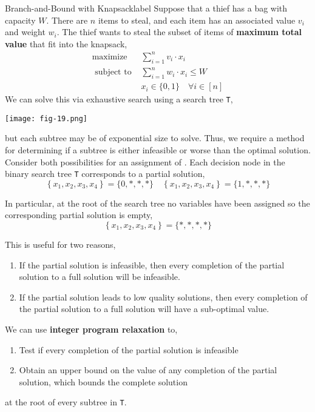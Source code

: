 \begin{ex}{Branch-and-Bound with Knapsack}{label}
	Suppose that a thief has a bag with capacity $W$. There are $n$ items to steal, and each item has an associated value $v_i$ and weight $w_i$. The thief wants to steal the subset of items of \textbf{maximum total value} that fit into the knapsack,
 	\[\begin{array}{ll}
		\operatorname{maximize} & \sum_{i=1}^{n} v_{i} \cdot x_{i} \\
		\text{ subject to } & \sum_{i=1}^{n} w_{i} \cdot x_{i} \leq W \\
		& x_{i} \in\{0,1\} \quad \forall i \in[n]
	\end{array}\]
	We can solve this via exhaustive search using a search tree \texttt{T},
	\begin{center}
		\texttt{[image: fig-19.png]}
	\end{center}
	but each subtree may be of exponential size to solve. Thus, we require a method for determining if a subtree is either infeasible or worse than the optimal solution. Consider both possibilities for an assignment of . Each decision node in the binary search tree \texttt{T} corresponds to a partial solution,
	\[\left\{x_{1}, x_{2}, x_{3}, x_{4}\right\}=\{0, *, *, *\} \quad\left\{x_{1}, x_{2}, x_{3}, x_{4}\right\}=\{1, *, *, *\}\]

	In particular, at the root of the search tree no variables have been assigned so the corresponding partial solution is empty,
	\[\left\{x_{1}, x_{2}, x_{3}, x_{4}\right\}=\{*, *, *, *\}\]

	This is useful for two reasons,
	\begin{enumerate}
		\item If the partial solution is infeasible, then every completion of the partial solution to a full solution will be infeasible.
		\item If the partial solution leads to low quality solutions, then every completion of the partial solution to a full solution will have a sub-optimal value.
	\end{enumerate}

	We can use \textbf{integer program relaxation} to,
	\begin{enumerate}
		\item Test if every completion of the partial solution is infeasible
		\item Obtain an upper bound on the value of any completion of the partial solution, which bounds the complete solution
	\end{enumerate}
	at the root of every subtree in \texttt{T}.
\end{ex}


